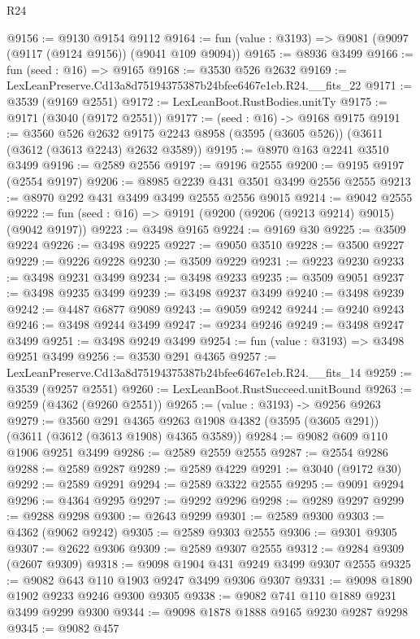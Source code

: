 \begin{lexlean}{R24}
\begin{coremodule}
@9156 := @9130 @9154 @9112
@9164 := fun (value : @3193) => @9081 (@9097 (@9117 (@9124 @9156)) (@9041 @109 @9094))
@9165 := @8936 @3499
@9166 := fun (seed : @16) => @9165
@9168 := @3530 @526 @2632
@9169 := LexLeanPreserve.Cd13a8d75194375387b24bfee6467e1eb.R24.__fits_22
@9171 := @3539 (@9169 @2551)
@9172 := LexLeanBoot.RustBodies.unitTy
@9175 := @9171 (@3040 (@9172 @2551))
@9177 := (seed : @16) -> @9168 @9175
@9191 := @3560
    @526
    @2632
    @9175
    @2243
    @8958
    (@3595 (@3605 @526))
    (@3611 (@3612 (@3613 @2243) @2632 @3589))
@9195 := @8970 @163 @2241 @3510 @3499
@9196 := @2589 @2556
@9197 := @9196 @2555
@9200 := @9195 @9197 (@2554 @9197)
@9206 := @8985 @2239 @431 @3501 @3499 @2556 @2555
@9213 := @8970 @292 @431 @3499 @3499 @2555 @2556 @9015
@9214 := @9042 @2555
@9222 := fun (seed : @16) => @9191 (@9200 (@9206 (@9213 @9214) @9015) (@9042 @9197))
@9223 := @3498 @9165
@9224 := @9169 @30
@9225 := @3509 @9224
@9226 := @3498 @9225
@9227 := @9050 @3510
@9228 := @3500 @9227
@9229 := @9226 @9228
@9230 := @3509 @9229
@9231 := @9223 @9230
@9233 := @3498 @9231 @3499
@9234 := @3498 @9233
@9235 := @3509 @9051
@9237 := @3498 @9235 @3499
@9239 := @3498 @9237 @3499
@9240 := @3498 @9239
@9242 := @4487 @6877 @9089
@9243 := @9059 @9242
@9244 := @9240 @9243
@9246 := @3498 @9244 @3499
@9247 := @9234 @9246
@9249 := @3498 @9247 @3499
@9251 := @3498 @9249 @3499
@9254 := fun (value : @3193) => @3498 @9251 @3499
@9256 := @3530 @291 @4365
@9257 := LexLeanPreserve.Cd13a8d75194375387b24bfee6467e1eb.R24.__fits_14
@9259 := @3539 (@9257 @2551)
@9260 := LexLeanBoot.RustSucceed.unitBound
@9263 := @9259 (@4362 (@9260 @2551))
@9265 := (value : @3193) -> @9256 @9263
@9279 := @3560
    @291
    @4365
    @9263
    @1908
    @4382
    (@3595 (@3605 @291))
    (@3611 (@3612 (@3613 @1908) @4365 @3589))
@9284 := @9082 @609 @110 @1906 @9251 @3499
@9286 := @2589 @2559 @2555
@9287 := @2554 @9286
@9288 := @2589 @9287
@9289 := @2589 @4229
@9291 := @3040 (@9172 @30)
@9292 := @2589 @9291
@9294 := @2589 @3322 @2555
@9295 := @9091 @9294
@9296 := @4364 @9295
@9297 := @9292 @9296
@9298 := @9289 @9297
@9299 := @9288 @9298
@9300 := @2643 @9299
@9301 := @2589 @9300
@9303 := @4362 (@9062 @9242)
@9305 := @2589 @9303 @2555
@9306 := @9301 @9305
@9307 := @2622 @9306
@9309 := @2589 @9307 @2555
@9312 := @9284 @9309 (@2607 @9309)
@9318 := @9098 @1904 @431 @9249 @3499 @9307 @2555
@9325 := @9082 @643 @110 @1903 @9247 @3499 @9306 @9307
@9331 := @9098 @1890 @1902 @9233 @9246 @9300 @9305
@9338 := @9082 @741 @110 @1889 @9231 @3499 @9299 @9300
@9344 := @9098 @1878 @1888 @9165 @9230 @9287 @9298
@9345 := @9082 @457

\end{coremodule}
\end{lexlean}

